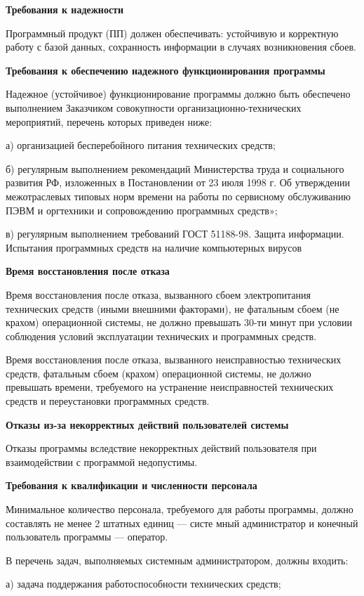 \textbf{Требования к надежности}

Программный продукт (ПП) должен обеспечивать: устойчивую и корректную работу с базой данных,
сохранность информации в случаях возникновения сбоев.

\textbf{Требования к обеспечению надежного функционирования программы}

Надежное (устойчивое) функционирование программы должно быть обеспечено выполнением
Заказчиком совокупности организационно-технических мероприятий, перечень которых приведен ниже:

а) организацией бесперебойного питания технических средств;

б) регулярным выполнением рекомендаций Министерства труда и социального развития РФ,
изложенных в Постановлении от 23 июля 1998 г. Об утверждении межотраслевых типовых норм
времени на работы по сервисному обслуживанию ПЭВМ и оргтехники и сопровождению программных средств»;

в) регулярным выполнением требований ГОСТ 51188-98. Защита информации. Испытания программных средств на наличие компьютерных вирусов

\textbf{Время восстановления после отказа}

Время восстановления после отказа, вызванного сбоем электропитания технических средств (иными внешними факторами),
не фатальным сбоем (не крахом) операционной системы, не должно превышать 30-ти минут при условии соблюдения условий
эксплуатации технических и программных средств.

Время восстановления после отказа, вызванного неисправностью технических средств, фатальным сбоем (крахом) операционной
системы, не должно превышать времени, требуемого на устранение неисправностей технических средств и переустановки программных средств.

\textbf{Отказы из-за некорректных действий пользователей системы}

Отказы программы вследствие некорректных действий пользователя при взаимодействии с программой недопустимы.

\textbf{Требования к квалификации и численности персонала}

Минимальное количество персонала, требуемого для работы программы, должно составлять не менее 2 штатных единиц — систе
мный администратор и конечный пользователь программы — оператор.

В перечень задач, выполняемых системным администратором, должны входить:

а) задача поддержания работоспособности технических средств;

